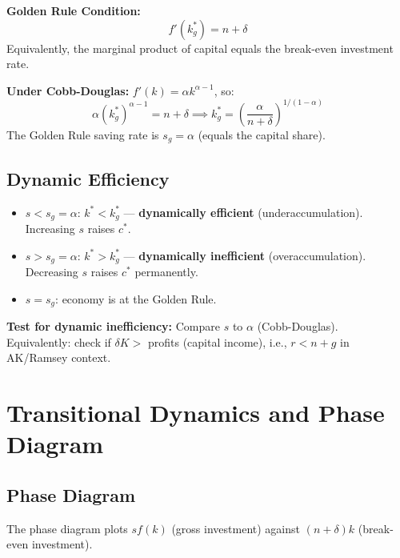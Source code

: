 \documentclass[a4paper,11pt]{article}
\begin{document}
\begin{resultbox}
\textbf{Golden Rule Condition:}
\[
\boxed{f'(k_g^*) = n + \delta}
\]
Equivalently, the marginal product of capital equals the break-even investment rate.

\textbf{Under Cobb-Douglas:} $f'(k) = \alpha k^{\alpha-1}$, so:
\[
\alpha (k_g^*)^{\alpha-1} = n+\delta \implies k_g^* = \left(\frac{\alpha}{n+\delta}\right)^{1/(1-\alpha)}
\]
The Golden Rule saving rate is $\boxed{s_g = \alpha}$ (equals the capital share).
\end{resultbox}

\subsection*{Dynamic Efficiency}

\begin{itemize}
    \item $s < s_g = \alpha$: $k^* < k_g^*$ — \textbf{dynamically efficient} (underaccumulation). Increasing $s$ raises $c^*$.
    \item $s > s_g = \alpha$: $k^* > k_g^*$ — \textbf{dynamically inefficient} (overaccumulation). Decreasing $s$ raises $c^*$ permanently.
    \item $s = s_g$: economy is at the Golden Rule.
\end{itemize}

\begin{keyformulabox}
\textbf{Test for dynamic inefficiency:} Compare $s$ to $\alpha$ (Cobb-Douglas). \\
Equivalently: check if $\delta K > $ profits (capital income), i.e., $r < n+g$ in AK/Ramsey context.
\end{keyformulabox}

\section{Transitional Dynamics and Phase Diagram}

\subsection*{Phase Diagram}

The phase diagram plots $sf(k)$ (gross investment) against $(n+\delta)k$ (break-even investment).
\end{document}
